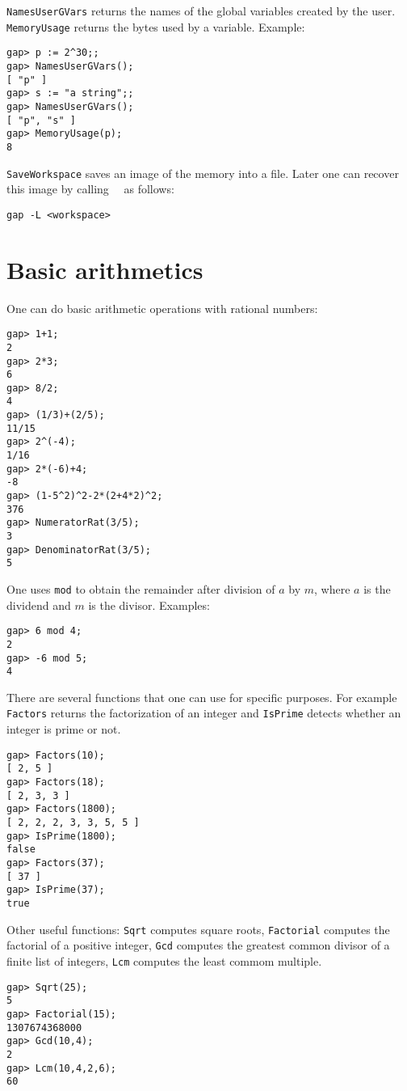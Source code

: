\lstinline{NamesUserGVars} returns the names 
of the global variables created by the user. \lstinline{MemoryUsage} returns 
the bytes used by a variable. Example:
\begin{lstlisting}
gap> p := 2^30;;
gap> NamesUserGVars();
[ "p" ]
gap> s := "a string";;
gap> NamesUserGVars();
[ "p", "s" ]
gap> MemoryUsage(p);
8
\end{lstlisting}

\lstinline{SaveWorkspace} saves an image of the memory into a file.  Later one
can recover this image by calling~\GAP~ as follows: 
\begin{lstlisting}
gap -L <workspace>
\end{lstlisting}


\section{Basic arithmetics}

One can do basic arithmetic operations with rational numbers:
\begin{lstlisting}
gap> 1+1;
2
gap> 2*3;
6
gap> 8/2;
4
gap> (1/3)+(2/5);
11/15
gap> 2^(-4);
1/16
gap> 2*(-6)+4;
-8
gap> (1-5^2)^2-2*(2+4*2)^2;
376
gap> NumeratorRat(3/5);
3
gap> DenominatorRat(3/5);
5
\end{lstlisting}
One uses \lstinline{mod} to obtain the remainder after division of $a$ by $m$,
where $a$ is the dividend and $m$ is the divisor.  Examples: 
\begin{lstlisting}
gap> 6 mod 4;
2
gap> -6 mod 5;
4
\end{lstlisting}
There are several functions that one can use for specific purposes. For example 
\lstinline{Factors} returns the factorization of an integer and 
\lstinline{IsPrime} detects whether an integer is prime or not.
\begin{lstlisting}
gap> Factors(10);
[ 2, 5 ]
gap> Factors(18);
[ 2, 3, 3 ]
gap> Factors(1800);
[ 2, 2, 2, 3, 3, 5, 5 ]
gap> IsPrime(1800);
false
gap> Factors(37);
[ 37 ]
gap> IsPrime(37);
true
\end{lstlisting}
Other useful functions: \lstinline{Sqrt} computes square roots, 
\lstinline{Factorial} computes the factorial of a positive integer, 
\lstinline{Gcd} computes the greatest common divisor of a finite list of integers, 
\lstinline{Lcm} computes the least commom multiple. 
\begin{lstlisting}
gap> Sqrt(25);
5
gap> Factorial(15);
1307674368000
gap> Gcd(10,4);
2
gap> Lcm(10,4,2,6);
60
\end{lstlisting}

